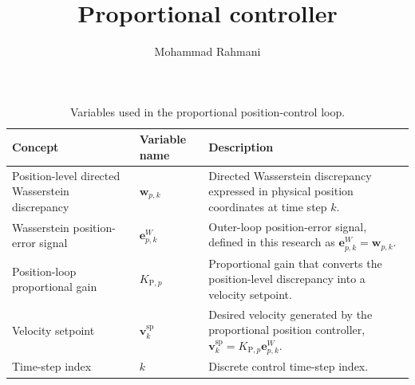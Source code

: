\documentclass[a4paper]{article}
\title{Proportional controller}
\date{}
\author{Mohammad Rahmani}
\begin{document}
   \maketitle

   \begin{table}[H]
      \centering
      \small
      \setlength{\tabcolsep}{4pt}
      \begin{tabular}{p{} p{} p{}}
         \hline
         \textbf{Concept} & \textbf{Variable name} & \textbf{Description} \\
         \hline

         Position-level directed Wasserstein discrepancy
         & $\mathbf{w}_{p,k}$
         & Directed Wasserstein discrepancy expressed in physical position coordinates at time step $k$. \\

         Wasserstein position-error signal
         & $\mathbf{e}^{W}_{p,k}$
         & Outer-loop position-error signal, defined in this research as $\mathbf{e}^{W}_{p,k}=\mathbf{w}_{p,k}$. \\

         Position-loop proportional gain
         & $K_{\mathrm{P},p}$
         & Proportional gain that converts the position-level discrepancy into a velocity setpoint. \\

         Velocity setpoint
         & $\mathbf{v}^{\mathrm{sp}}_k$
         & Desired velocity generated by the proportional position controller, $\mathbf{v}^{\mathrm{sp}}_k=K_{\mathrm{P},p}\mathbf{e}^{W}_{p,k}$. \\

         Time-step index
         & $k$
         & Discrete control time-step index. \\

         \hline
      \end{tabular}

      \caption{Variables used in the proportional position-control loop.}
      \label{tab:proportional-controller-variables}
   \end{table}

   
   
\end{document}
